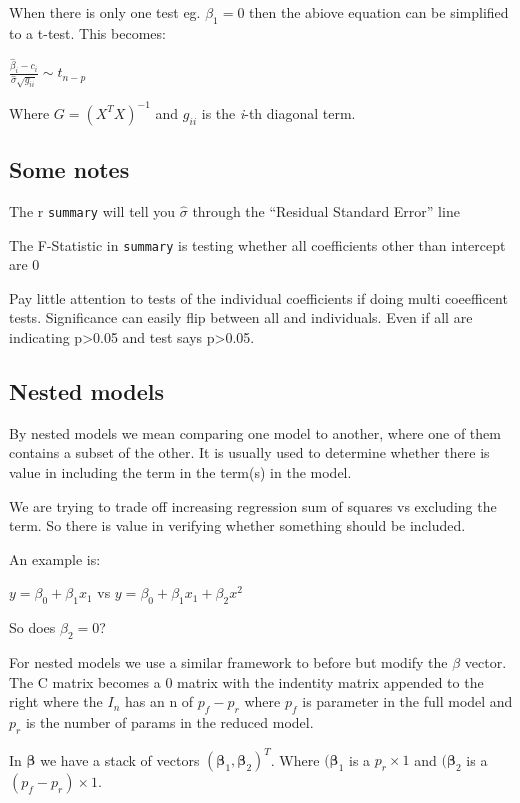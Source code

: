 \documentclass[
  letterpaper,
  DIV=11,
  numbers=noendperiod]{scrreprt}
\begin{document}
When there is only one test eg. \(\beta_1=0\) then the abiove equation
can be simplified to a t-test. This becomes:

\(\frac{\hat{\beta}_i - c_i}{\hat{\sigma} \sqrt{g_{ii}}} \sim t_{n-p}\)

Where \(G = (X^TX)^{-1}\) and \(g_{ii}\) is the \emph{i}-th diagonal
term.

\hypertarget{some-notes}{%
\subsection{Some notes}\label{some-notes}}

The r \texttt{summary} will tell you \(\hat{\sigma}\) through the
``Residual Standard Error'' line

The F-Statistic in \texttt{summary} is testing whether all coefficients
other than intercept are 0

Pay little attention to tests of the individual coefficients if doing
multi coeefficent tests. Significance can easily flip between all and
individuals. Even if all are indicating p\textgreater0.05 and test says
p\textgreater0.05.

\hypertarget{nested-models}{%
\subsection{Nested models}\label{nested-models}}

By nested models we mean comparing one model to another, where one of
them contains a subset of the other. It is usually used to determine
whether there is value in including the term in the term(s) in the
model.

We are trying to trade off increasing regression sum of squares vs
excluding the term. So there is value in verifying whether something
should be included.

An example is:

\(y= \beta_0 + \beta_1x_1\) vs \(y= \beta_0 + \beta_1x_1 + \beta_2 x^2\)

So does \(\beta_2 = 0\)?

For nested models we use a similar framework to before but modify the
\(\beta\) vector. The C matrix becomes a 0 matrix with the indentity
matrix appended to the right where the \(I_n\) has an n of \(p_f - p_r\)
where \(p_f\) is parameter in the full model and \(p_r\) is the number
of params in the reduced model.

In \(\boldsymbol{\beta}\) we have a stack of vectors
\((\boldsymbol{\beta}_1, \boldsymbol{\beta}_2)^T\). Where
\((\boldsymbol{\beta}_1\) is a \(p_r \times 1\) and
\((\boldsymbol{\beta}_2\) is a \((p_f - p_r) \times 1\).
\end{document}
